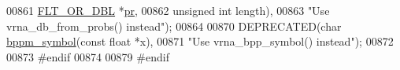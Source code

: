 \begin{DoxyCode}
00861                                    \hyperlink{group__data__structures_ga31125aeace516926bf7f251f759b6126}{FLT\_OR\_DBL}   *\hyperlink{fold__vars_8h_ac98ec419070aee6831b44e5c700f090f}{pr},
00862                                    \textcolor{keywordtype}{unsigned} \textcolor{keywordtype}{int} length),
00863            \textcolor{stringliteral}{"Use vrna\_db\_from\_probs() instead"});
00864 
00870 DEPRECATED(\textcolor{keywordtype}{char}    \hyperlink{group__struct__utils__deprecated_ga49962ad6242b8c628de6ca16bb831c1d}{bppm\_symbol}(\textcolor{keyword}{const} \textcolor{keywordtype}{float} *x),
00871            \textcolor{stringliteral}{"Use vrna\_bpp\_symbol() instead"});
00872 
00873 \textcolor{preprocessor}{#endif}
00874 
00879 \textcolor{preprocessor}{#endif}
\end{DoxyCode}
